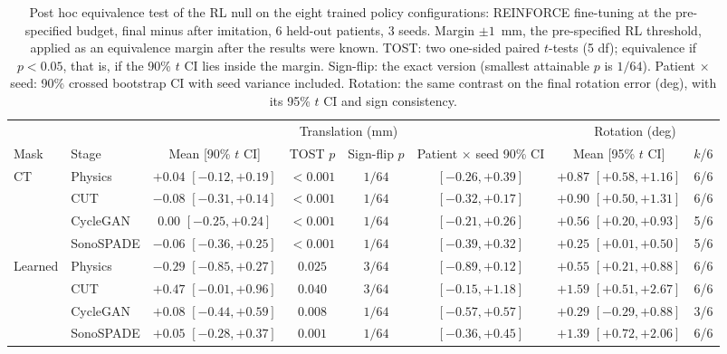 
\begin{table}[t]
\caption{Post hoc equivalence test of the RL null on the eight trained policy configurations: REINFORCE fine-tuning at the pre-specified budget, final minus after imitation, 6 held-out patients, 3 seeds. Margin $\pm1$~mm, the pre-specified RL threshold, applied as an equivalence margin after the results were known. TOST: two one-sided paired $t$-tests (5 df); equivalence if $p < 0.05$, that is, if the 90\% $t$ CI lies inside the margin. Sign-flip: the exact version (smallest attainable $p$ is $1/64$). Patient $\times$ seed: 90\% crossed bootstrap CI with seed variance included. Rotation: the same contrast on the final rotation error (deg), with its 95\% $t$ CI and sign consistency.}
\label{tab:rl-tost}
\centering
\renewcommand{\baselinestretch}{1}\footnotesize
\setlength{\tabcolsep}{3pt}
\begin{tabular}{@{}llcccccc@{}}
\toprule
 & & \multicolumn{4}{c}{Translation (mm)} & \multicolumn{2}{c}{Rotation (deg)} \\
\cmidrule(lr){3-6}\cmidrule(l){7-8}
Mask & Stage & Mean [90\% $t$ CI] & TOST $p$ & Sign-flip $p$ & Patient $\times$ seed 90\% CI & Mean [95\% $t$ CI] & $k$/6 \\
\midrule
CT & Physics & $+0.04$ $[-0.12, +0.19]$ & $<0.001$ & $1/64$ & $[-0.26, +0.39]$ & $+0.87$ $[+0.58, +1.16]$ & 6/6 \\
 & CUT & $-0.08$ $[-0.31, +0.14]$ & $<0.001$ & $1/64$ & $[-0.32, +0.17]$ & $+0.90$ $[+0.50, +1.31]$ & 6/6 \\
 & CycleGAN & $0.00$ $[-0.25, +0.24]$ & $<0.001$ & $1/64$ & $[-0.21, +0.26]$ & $+0.56$ $[+0.20, +0.93]$ & 5/6 \\
 & SonoSPADE & $-0.06$ $[-0.36, +0.25]$ & $<0.001$ & $1/64$ & $[-0.39, +0.32]$ & $+0.25$ $[+0.01, +0.50]$ & 5/6 \\
\addlinespace
Learned & Physics & $-0.29$ $[-0.85, +0.27]$ & $0.025$ & $3/64$ & $[-0.89, +0.12]$ & $+0.55$ $[+0.21, +0.88]$ & 6/6 \\
 & CUT & $+0.47$ $[-0.01, +0.96]$ & $0.040$ & $3/64$ & $[-0.15, +1.18]$ & $+1.59$ $[+0.51, +2.67]$ & 6/6 \\
 & CycleGAN & $+0.08$ $[-0.44, +0.59]$ & $0.008$ & $1/64$ & $[-0.57, +0.57]$ & $+0.29$ $[-0.29, +0.88]$ & 3/6 \\
 & SonoSPADE & $+0.05$ $[-0.28, +0.37]$ & $0.001$ & $1/64$ & $[-0.36, +0.45]$ & $+1.39$ $[+0.72, +2.06]$ & 6/6 \\
\bottomrule
\end{tabular}
\end{table}
